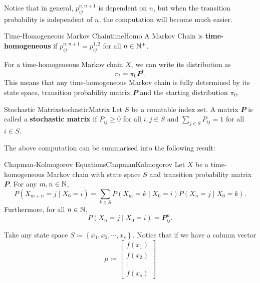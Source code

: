 \documentclass[math, code]{amznotes}
\theoremstyle{remark}
\begin{document}
Notice that in general, $p_{ij}^{n, n + 1}$ is dependent on $n$, but when the transition probability is independent of $n$, the computation will become much easier.
\begin{dfnbox}{Time-Homogeneous Markov Chain}{timeHomo}
    A Markov Chain is {\color{red} \textbf{time-homogeneous}} if $p_{ij}^{n, n + 1} = p_{ij}^{1, 2}$ for all $n \in \mathbb{N}^+$.
\end{dfnbox}
For a time-homogeneous Markov chain $X$, we can write its distribution as 
\begin{equation*}
    \pi_t = \pi_0\mathbfit{P}^t.
\end{equation*}
This means that any time-homogeneous Markov chain is fully determined by its state space, transition probability matrix $\mathbfit{P}$ and the starting distribution $\pi_0$.
\begin{dfnbox}{Stochastic Matrix}{stochasticMatrix}
    Let $S$ be a countable index set. A matrix $\mathbfit{P}$ is called a {\color{red} \textbf{stochastic matrix}} if $P_{ij} \geq 0$ for all $i, j \in S$ and $\sum_{j \in S}P_{ij} = 1$ for all $i \in S$.
\end{dfnbox}
The above computation can be summarised into the following result:
\begin{thmbox}{Chapman-Kolmogorov Equations}{ChapmanKolmogorov}
    Let $X$ be a time-homogeneous Markov chain with state space $S$ and transition probability matrix $\mathbfit{P}$. For any $m, n \in \mathbb{N}$, 
    \begin{equation*}
        P\left(X_{m + n} = j \mid X_0 = i\right) = \sum_{k \in S}P\left(X_m = k \mid X_0 = i\right)P\left(X_n = j \mid X_0 = k\right).
    \end{equation*}
    Furthermore, for all $n \in \mathbb{N}$,\
    \begin{equation*}
        P\left(X_n = j \mid X_0 = i\right) = \mathbfit{P}^n_{ij}.
    \end{equation*}
\end{thmbox}
Take any state space $S \coloneqq \left\{x_1, x_2, \cdots, x_s\right\}$. Notice that if we have a column vector 
\begin{equation*}
    \mu \coloneqq \begin{bmatrix}
        f\left(x_1\right) \\
        f\left(x_2\right) \\
        \vdots \\
        f\left(x_s\right)
    \end{bmatrix}
\end{equation*}
\end{document}
